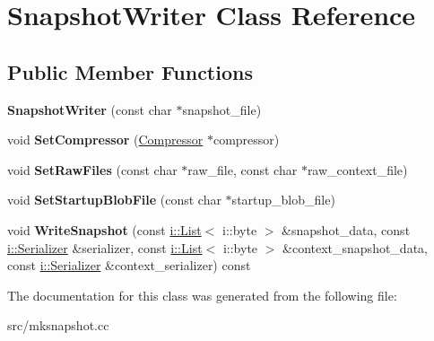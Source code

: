 \hypertarget{class_snapshot_writer}{}\section{Snapshot\+Writer Class Reference}
\label{class_snapshot_writer}
\subsection*{Public Member Functions}
\begin{DoxyCompactItemize}
\item 
\hypertarget{class_snapshot_writer_a64af298158abb11d68b647e3d780c4ca}{}{\bfseries Snapshot\+Writer} (const char $\ast$snapshot\+\_\+file)\label{class_snapshot_writer_a64af298158abb11d68b647e3d780c4ca}

\item 
\hypertarget{class_snapshot_writer_a9f85ac6858e2bc4c700676a4fb056719}{}void {\bfseries Set\+Compressor} (\hyperlink{class_compressor}{Compressor} $\ast$compressor)\label{class_snapshot_writer_a9f85ac6858e2bc4c700676a4fb056719}

\item 
\hypertarget{class_snapshot_writer_a97bab67a23f5596b578d45e939b0dea9}{}void {\bfseries Set\+Raw\+Files} (const char $\ast$raw\+\_\+file, const char $\ast$raw\+\_\+context\+\_\+file)\label{class_snapshot_writer_a97bab67a23f5596b578d45e939b0dea9}

\item 
\hypertarget{class_snapshot_writer_a90fab85303850b6830bfe074e991ca2e}{}void {\bfseries Set\+Startup\+Blob\+File} (const char $\ast$startup\+\_\+blob\+\_\+file)\label{class_snapshot_writer_a90fab85303850b6830bfe074e991ca2e}

\item 
\hypertarget{class_snapshot_writer_a7052513b3fd257f257affabc104eba9d}{}void {\bfseries Write\+Snapshot} (const \hyperlink{classv8_1_1internal_1_1_list}{i\+::\+List}$<$ i\+::byte $>$ \&snapshot\+\_\+data, const \hyperlink{classv8_1_1internal_1_1_serializer}{i\+::\+Serializer} \&serializer, const \hyperlink{classv8_1_1internal_1_1_list}{i\+::\+List}$<$ i\+::byte $>$ \&context\+\_\+snapshot\+\_\+data, const \hyperlink{classv8_1_1internal_1_1_serializer}{i\+::\+Serializer} \&context\+\_\+serializer) const \label{class_snapshot_writer_a7052513b3fd257f257affabc104eba9d}

\end{DoxyCompactItemize}


The documentation for this class was generated from the following file\+:\begin{DoxyCompactItemize}
\item 
src/mksnapshot.\+cc\end{DoxyCompactItemize}
